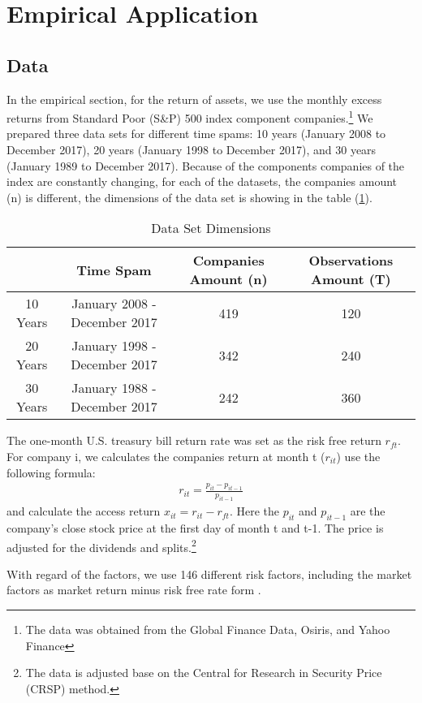 \documentclass[12pt]{article}
\begin{document}
	\section{Empirical Application}
	\subsection{Data}
	
In the empirical section, for the return of assets,  we use the monthly excess returns from Standard Poor (S\&P) 500 index component companies.\footnote{The data was obtained from the Global Finance Data, Osiris, and Yahoo Finance}
We prepared three data sets for different time spams: 10 years (January 2008 to December 2017), 20 years (January 1998 to December 2017), and 30 years (January 1989 to December 2017).
Because of the components companies of the index are constantly changing, for each of the datasets, the companies amount (n) is different, the dimensions of the data set is showing in the table (\ref{Data_set}).


\begin{table}[h]
		\caption{Data Set Dimensions}
			\label{Data_set}
	\begin{tabular}{c|ccc}
		\hline
		& Time Spam                    & Companies Amount (n) & Observations Amount (T) \\ \hline
		10 Years & January 2008 - December 2017 & 419                  & 120                     \\
		20 Years & January 1998 - December 2017 & 342                  & 240                     \\
		30 Years & January 1988 - December 2017 & 242                  & 360                     \\ \hline
	\end{tabular}
\end{table}
The one-month U.S. treasury bill return rate was set as the risk free return $r_{ft}$.
For company i, we calculates the companies return at month t ($r_{it}$) use the following formula:
\begin{align*}
r_{it} = \frac{p_{i t} - p_{i t-1}}{p_{i t-1}}
\end{align*}
and calculate the access return $x_{it} = r_{it} - r_{ft}$.
Here the $p_{it}$ and $p_{i t-1}$ are the company's close stock price at the first day of month t and t-1.
The price is adjusted for the dividends and splits.\footnote{The data is adjusted base on the Central for Research in Security Price (CRSP) method.}

	With regard of the factors, we use 146 different risk factors, including the market factors as market return minus risk free rate form .

\newpage


\end{document}
